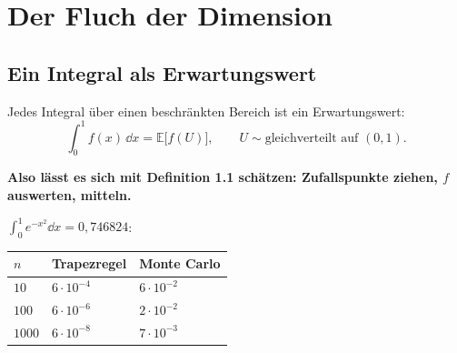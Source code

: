\chapter{Der Fluch der Dimension}

\section{Ein Integral als Erwartungswert}

\begin{merksatz}
Jedes Integral über einen beschränkten Bereich ist ein Erwartungswert:
\[ \int_0^1 f(x)\,\dd x = \mathbb{E}\bigl[f(U)\bigr], \qquad U \sim \text{gleichverteilt auf } (0,1) . \]

\begin{center}
\begin{minipage}{0.9\textwidth}
\textbf{Also lässt es sich mit Definition 1.1 schätzen: Zufallspunkte ziehen, $f$ auswerten, mitteln.}
\end{minipage}
\end{center}

$\int_0^1 e^{-x^{2}}\dd x = 0{,}746824$:

\begin{center}
{\small
\renewcommand{\arraystretch}{1.48}
\begin{tabular}{@{}P{1.4cm}P{2.6cm}P{2.6cm}@{}}
\toprule
$n$ & \textbf{Trapezregel} & \textbf{Monte Carlo}\\
\midrule
$10$ & $6\cdot10^{-4}$ & $6\cdot10^{-2}$\\
$100$ & $6\cdot10^{-6}$ & $2\cdot10^{-2}$\\
$1000$ & $6\cdot10^{-8}$ & $7\cdot10^{-3}$\\
\bottomrule
\end{tabular}}
\end{center}

\begin{center}
\begin{minipage}{0.88\textwidth}
\end{minipage}
\end{center}
\end{merksatz}

